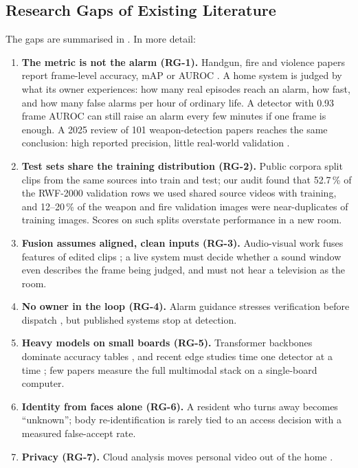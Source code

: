 \subsection{Research Gaps of Existing Literature}
The gaps are summarised in . In more detail:
\begin{enumerate}
\item \textbf{The metric is not the alarm (RG-1).} Handgun, fire and violence papers report frame-level accuracy, mAP or AUROC \cite{olmos2018handgun, muhammad2018fire, cheng2021rwf}. A home system is judged by what its owner experiences: how many real episodes reach an alarm, how fast, and how many false alarms per hour of ordinary life. A detector with 0.93 frame AUROC can still raise an alarm every few minutes if one frame is enough. A 2025 review of 101 weapon-detection papers reaches the same conclusion: high reported precision, little real-world validation \cite{murugan2025weaponreview}.
\item \textbf{Test sets share the training distribution (RG-2).} Public corpora split clips from the same sources into train and test; our audit found that 52.7\,\% of the RWF-2000 validation rows we used shared source videos with training, and 12--20\,\% of the weapon and fire validation images were near-duplicates of training images. Scores on such splits overstate performance in a new room.
\item \textbf{Fusion assumes aligned, clean inputs (RG-3).} Audio-visual work fuses features of edited clips \cite{wu2020xdviolence}; a live system must decide whether a sound window even describes the frame being judged, and must not hear a television as the room.
\item \textbf{No owner in the loop (RG-4).} Alarm guidance stresses verification before dispatch \cite{sampson2011false}, but published systems stop at detection.
\item \textbf{Heavy models on small boards (RG-5).} Transformer backbones dominate accuracy tables \cite{oquab2024dinov2, simeoni2025dinov3}, and recent edge studies time one detector at a time \cite{alqahtani2024edge, fierrosilva2026yolo26weapon}; few papers measure the full multimodal stack on a single-board computer.
\item \textbf{Identity from faces alone (RG-6).} A resident who turns away becomes ``unknown''; body re-identification \cite{zhou2019osnet} is rarely tied to an access decision with a measured false-accept rate.
\item \textbf{Privacy (RG-7).} Cloud analysis moves personal video out of the home \cite{shi2016edge, dpdp2023}.
\end{enumerate}

